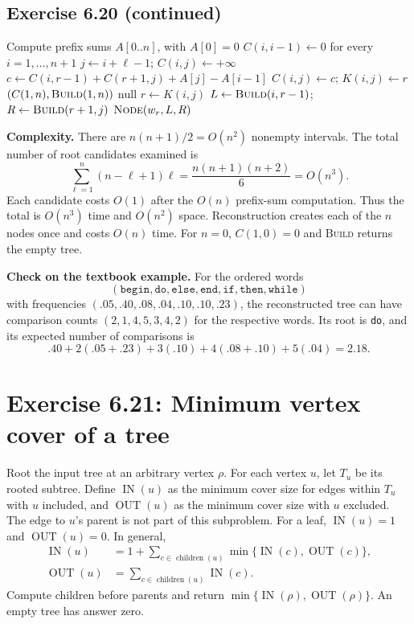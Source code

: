 \documentclass[11pt]{article}
\newcommand{\IN}{\operatorname{IN}}
\newcommand{\OUT}{\operatorname{OUT}}
\newcommand{\ch}{\operatorname{children}}
\newcommand{\exercise}[2]{\section*{Exercise #1: #2}}
\begin{document}
\subsection*{Exercise 6.20 (continued)}
\begin{algorithm}[H]
\caption{Optimal BST and its reconstruction}
\begin{algorithmic}[1]
 \State Compute prefix sums $A[0..n]$, with $A[0]=0$
 \State $C(i,i-1)\gets0$ for every $i=1,\ldots,n+1$
   \State $j\gets i+\ell-1$; $C(i,j)\gets+\infty$
    \State $c\gets C(i,r-1)+C(r+1,j)+A[j]-A[i-1]$
     \State $C(i,j)\gets c$; $K(i,j)\gets r$
    \EndIf
   \EndFor
  \EndFor
 \EndFor
 \State \Return $(C(1,n),\Call{Build}{1,n})$
\EndFunction
{}
  \State \Return $\mathrm{null}$ \EndIf
 \State $r\gets K(i,j)$
 \State $L\gets\Call{Build}{i,r-1}$; $R\gets\Call{Build}{r+1,j}$
 \State \Return $\Call{Node}{w_r,L,R}$
\EndFunction
\end{algorithmic}
\end{algorithm}

\textbf{Complexity.}
There are $n(n+1)/2=O(n^2)$ nonempty intervals. The total number of
root candidates examined is
\[
 \sum_{\ell=1}^n (n-\ell+1)\ell
 =\frac{n(n+1)(n+2)}6=O(n^3).
\]
Each candidate costs $O(1)$ after the $O(n)$ prefix-sum computation.
Thus the total is $\boxed{O(n^3)}$ time and $O(n^2)$ space.
Reconstruction creates each of the $n$ nodes once and costs $O(n)$ time.
For $n=0$, $C(1,0)=0$ and \textsc{Build} returns the empty tree.

\textbf{Check on the textbook example.}
For the ordered words
\[
 (\texttt{begin},\texttt{do},\texttt{else},\texttt{end},
   \texttt{if},\texttt{then},\texttt{while})
\]
with frequencies $(.05,.40,.08,.04,.10,.10,.23)$, the reconstructed tree
can have comparison counts $(2,1,4,5,3,4,2)$ for the respective words.
Its root is \texttt{do}, and its expected number of comparisons is
\[
 .40+2(.05+.23)+3(.10)+4(.08+.10)+5(.04)
 =\boxed{2.18}.
\]

\newpage
\exercise{6.21}{Minimum vertex cover of a tree}
Root the input tree at an arbitrary vertex $\rho$. For each vertex $u$,
let $T_u$ be its rooted subtree. Define $\IN(u)$ as the minimum cover
size for edges within $T_u$ with $u$ included, and $\OUT(u)$ as the
minimum cover size with $u$ excluded.
The edge to $u$'s parent is not part of this subproblem. For a leaf,
$\IN(u)=1$ and $\OUT(u)=0$. In general,
\[
 \boxed{\begin{aligned}
 \IN(u)&=1+\sum_{c\in\ch(u)}\min\{\IN(c),\OUT(c)\},\\
 \OUT(u)&=\sum_{c\in\ch(u)}\IN(c).
 \end{aligned}}
\]
Compute children before parents and return
$\min\{\IN(\rho),\OUT(\rho)\}$. An empty tree has answer zero.
\end{document}
